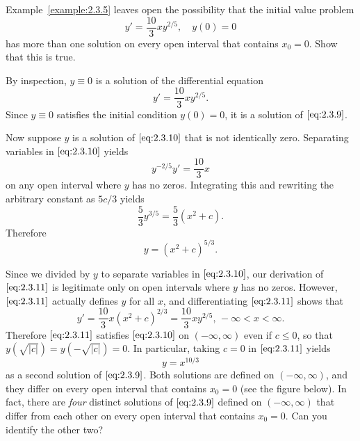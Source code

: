 \documentclass{ximera}
\begin{document}
\begin{example}\label{example:2.3.6}
Example~\ref{example:2.3.5} leaves open the possibility  that the
initial value problem
\begin{equation} \label{eq:2.3.9}
y'=\frac{10}{3}xy^{2/5}, \quad y(0)=0
\end{equation}
has more than one solution on every open interval that contains $x_0=0$.  Show
that this is true.

\begin{explanation}
By inspection, $y\equiv0$ is a solution of the
differential equation
\begin{equation} \label{eq:2.3.10}
y'=\frac{10}{3} xy ^{2/5}.
\end{equation}
 Since $y\equiv0$ satisfies the initial condition $y(0)=0$,
it is a solution of $\eqref{eq:2.3.9}$.

Now suppose $y$ is a solution of $\eqref{eq:2.3.10}$ that is not
identically zero.
 Separating variables in $\eqref{eq:2.3.10}$ yields
$$
 y^{-2/5}y'=\frac{10}{3}x
$$
on any open interval where $y$ has no zeros.
 Integrating this and rewriting the arbitrary constant as $5c/3$ yields
$$
\frac{5}{3}y^{3/5} = \frac{5}{3}(x^2+c).
$$
Therefore
\begin{equation} \label{eq:2.3.11}
y = (x^2+c)^{5/3}.
\end{equation}

Since we divided by $y$ to separate variables in $\eqref{eq:2.3.10}$, our
derivation of $\eqref{eq:2.3.11}$ is legitimate only on open intervals where $y$
has no zeros. However, $\eqref{eq:2.3.11}$ actually defines $y$ for all $x$,
and differentiating $\eqref{eq:2.3.11}$ shows that
$$
y'=\frac{10}{3}x(x^2+c)^{2/3}=\frac{10}{3}xy^{2/5},\,-\infty<x<\infty.
$$
Therefore $\eqref{eq:2.3.11}$ satisfies $\eqref{eq:2.3.10}$ on
$(-\infty,\infty)$
even if $c\le 0$, so that $y(\sqrt{|c|})=y(-\sqrt{|c|})=0$. In
particular, taking $c=0$ in $\eqref{eq:2.3.11}$ yields
$$
y=x^{10/3}
$$
as a second solution of $\eqref{eq:2.3.9}$.
 Both solutions are defined on
$(-\infty,\infty)$, and they differ on every
open interval that contains $x_0=0$ (see the figure below).
In fact, there are \textit{four} distinct solutions of
$\eqref{eq:2.3.9}$ defined on $(-\infty,\infty)$ that differ
from each other on every open interval that contains $x_0=0$.
  Can you identify the other two?

\begin{center}
\end{center}

\end{explanation}
\end{example}
\end{document}
